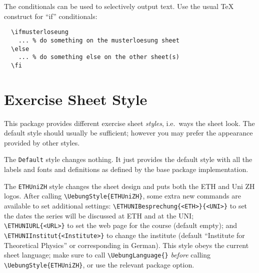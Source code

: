 \documentclass[11pt,a4paper]{article}
\begin{document}
The conditionals can be used to selectively output text. Use the usual \TeX{} construct
for ``if'' conditionals:
\begin{pkgverbatim}
\begin{verbatim}
  \ifmusterloseung
    ... % do something on the musterloesung sheet
  \else
    ... % do something else on the other sheet(s)
  \fi
\end{verbatim}
\end{pkgverbatim}



\section{Exercise Sheet Style}
\label{sec:styles}

This package provides different exercise sheet \emph{styles}, i.e.\ ways the sheet
look. The default style should usually be sufficient; however you may prefer the
appearance provided by other styles.


The \texttt{Default} style changes nothing. It just provides the default style with all
the labels and fonts and definitions as defined by the base package implementation.

The \texttt{ETHUniZH} style changes the sheet design and puts both the ETH and Uni ZH
logos. After calling \verb|\UebungStyle{ETHUniZH}|, some extra new commands are available
to set additional settings: \verb|\ETHUNIBesprechung{<ETH>}{<UNI>}| to set the dates the
series will be discussed at ETH and at the UNI; \verb|\ETHUNIURL{<URL>}| to set the web
page for the course (default empty); and \verb|\ETHUNIInstitut{<Institute>}| to change the
institute (default ``Institute for Theoretical Physics'' or corresponding in German). This
style obeys the current sheet language; make sure to call \verb|\UebungLanguage{}|
\emph{before} calling \verb|\UebungStyle{ETHUniZH}|, or use the relevant package option.
\end{document}
